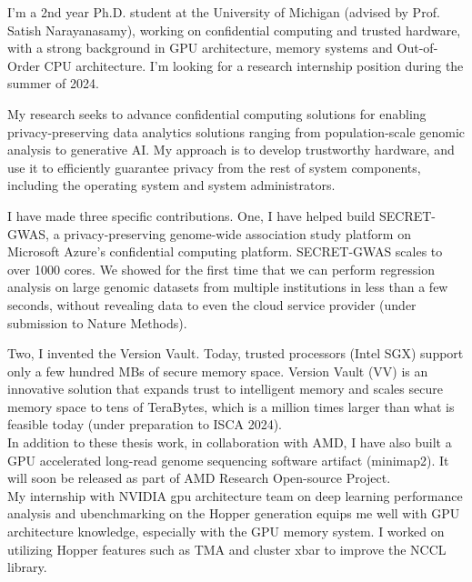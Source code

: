 I'm a 2nd year Ph.D. student at the University of Michigan (advised by Prof. Satish Narayanasamy), working on confidential computing and trusted hardware, with a strong background in GPU architecture, memory systems and Out-of-Order CPU architecture. I'm looking for a research internship position during the summer of 2024. \par
My research seeks to advance confidential computing solutions for enabling privacy-preserving data analytics solutions ranging from population-scale genomic analysis to generative AI.  My approach is to develop trustworthy hardware, and use it to efficiently guarantee privacy from the rest of system components, including the operating system and system administrators. \par

\vspace{3ex}

I have made three specific contributions. One, I have helped build SECRET-GWAS, a privacy-preserving genome-wide association study platform on Microsoft Azure's confidential computing platform. SECRET-GWAS scales to over 1000 cores. We showed for the first time that we can perform regression analysis on large genomic datasets from multiple institutions in less than a few seconds, without revealing data to even the cloud service provider (under submission to Nature Methods). \par

Two, I invented the Version Vault. Today, trusted processors (Intel SGX) support only a few hundred MBs of secure memory space. Version Vault (VV) is an innovative solution that expands trust to intelligent memory and scales secure memory space to tens of TeraBytes, which is a million times larger than what is feasible today (under preparation to ISCA 2024).\\

In addition to these thesis work, in collaboration with AMD, I have also built a GPU accelerated long-read genome sequencing software artifact (minimap2). It will soon be released as part of AMD Research Open-source Project. \\

My internship with NVIDIA gpu architecture team on deep learning performance analysis and ubenchmarking on the Hopper generation equips me well with GPU architecture knowledge, especially with the GPU memory system. I worked on utilizing Hopper features such as TMA and cluster xbar to improve the NCCL library. \\

